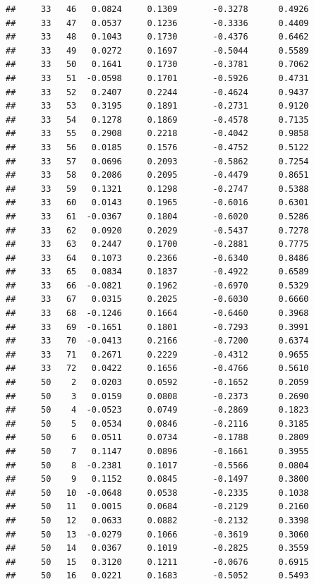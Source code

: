 \documentclass[
]{article}
\begin{document}
\begin{verbatim}
##     33   46   0.0824     0.1309       -0.3278      0.4926  
##     33   47   0.0537     0.1236       -0.3336      0.4409  
##     33   48   0.1043     0.1730       -0.4376      0.6462  
##     33   49   0.0272     0.1697       -0.5044      0.5589  
##     33   50   0.1641     0.1730       -0.3781      0.7062  
##     33   51  -0.0598     0.1701       -0.5926      0.4731  
##     33   52   0.2407     0.2244       -0.4624      0.9437  
##     33   53   0.3195     0.1891       -0.2731      0.9120  
##     33   54   0.1278     0.1869       -0.4578      0.7135  
##     33   55   0.2908     0.2218       -0.4042      0.9858  
##     33   56   0.0185     0.1576       -0.4752      0.5122  
##     33   57   0.0696     0.2093       -0.5862      0.7254  
##     33   58   0.2086     0.2095       -0.4479      0.8651  
##     33   59   0.1321     0.1298       -0.2747      0.5388  
##     33   60   0.0143     0.1965       -0.6016      0.6301  
##     33   61  -0.0367     0.1804       -0.6020      0.5286  
##     33   62   0.0920     0.2029       -0.5437      0.7278  
##     33   63   0.2447     0.1700       -0.2881      0.7775  
##     33   64   0.1073     0.2366       -0.6340      0.8486  
##     33   65   0.0834     0.1837       -0.4922      0.6589  
##     33   66  -0.0821     0.1962       -0.6970      0.5329  
##     33   67   0.0315     0.2025       -0.6030      0.6660  
##     33   68  -0.1246     0.1664       -0.6460      0.3968  
##     33   69  -0.1651     0.1801       -0.7293      0.3991  
##     33   70  -0.0413     0.2166       -0.7200      0.6374  
##     33   71   0.2671     0.2229       -0.4312      0.9655  
##     33   72   0.0422     0.1656       -0.4766      0.5610  
##     50    2   0.0203     0.0592       -0.1652      0.2059  
##     50    3   0.0159     0.0808       -0.2373      0.2690  
##     50    4  -0.0523     0.0749       -0.2869      0.1823  
##     50    5   0.0534     0.0846       -0.2116      0.3185  
##     50    6   0.0511     0.0734       -0.1788      0.2809  
##     50    7   0.1147     0.0896       -0.1661      0.3955  
##     50    8  -0.2381     0.1017       -0.5566      0.0804  
##     50    9   0.1152     0.0845       -0.1497      0.3800  
##     50   10  -0.0648     0.0538       -0.2335      0.1038  
##     50   11   0.0015     0.0684       -0.2129      0.2160  
##     50   12   0.0633     0.0882       -0.2132      0.3398  
##     50   13  -0.0279     0.1066       -0.3619      0.3060  
##     50   14   0.0367     0.1019       -0.2825      0.3559  
##     50   15   0.3120     0.1211       -0.0676      0.6915  
##     50   16   0.0221     0.1683       -0.5052      0.5493  

\end{verbatim}
\end{document}
